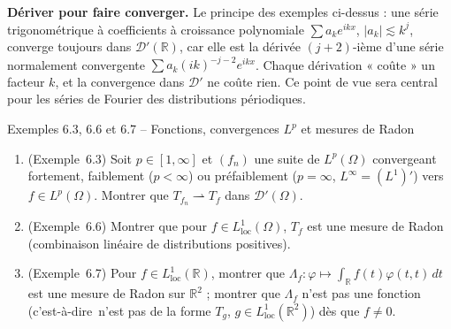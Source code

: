 \documentclass[11pt,a4paper]{article}
\newcommand{\R}{\mathbb{R}}
\newcommand{\ie}{c'est-à-dire}
\newcommand{\D}{\mathcal{D}}
\theoremstyle{definition}
\begin{document}
\begin{pointcle}
\textbf{Dériver pour faire converger.} Le principe des exemples ci-dessus : une série trigonométrique à coefficients à croissance polynomiale $\sum a_ke^{ikx}$, $|a_k|\lesssim k^j$, converge toujours dans $\D'(\R)$, car elle est la dérivée $(j+2)$-ième d'une série normalement convergente $\sum a_k(ik)^{-j-2}e^{ikx}$. Chaque dérivation « coûte » un facteur $k$, et la convergence dans $\D'$ ne coûte rien. Ce point de vue sera central pour les séries de Fourier des distributions périodiques.
\end{pointcle}

\begin{exo}{Exemples 6.3, 6.6 et 6.7 -- Fonctions, convergences $L^p$ et mesures de Radon}
\begin{enumerate}[label=(\alph*)]
  \item (Exemple~6.3) Soit $p\in[1,\infty]$ et $(f_n)$ une suite de $L^p(\Omega)$ convergeant fortement, faiblement ($p<\infty$) ou préfaiblement ($p=\infty$, $L^\infty=(L^1)'$) vers $f\in L^p(\Omega)$. Montrer que $T_{f_n}\rightharpoonup T_f$ dans $\D'(\Omega)$.
  \item (Exemple~6.6) Montrer que pour $f\in L^1_{\mathrm{loc}}(\Omega)$, $T_f$ est une mesure de Radon (combinaison linéaire de distributions positives).
  \item (Exemple~6.7) Pour $f\in L^1_{\mathrm{loc}}(\R)$, montrer que $\Lambda_f:\varphi\mapsto\int_\R f(t)\varphi(t,t)\,dt$ est une mesure de Radon sur $\R^2$ ; montrer que $\Lambda_f$ n'est pas une fonction (\ie\ n'est pas de la forme $T_g$, $g\in L^1_{\mathrm{loc}}(\R^2)$) dès que $f\ne0$.
\end{enumerate}
\end{exo}
\end{document}
